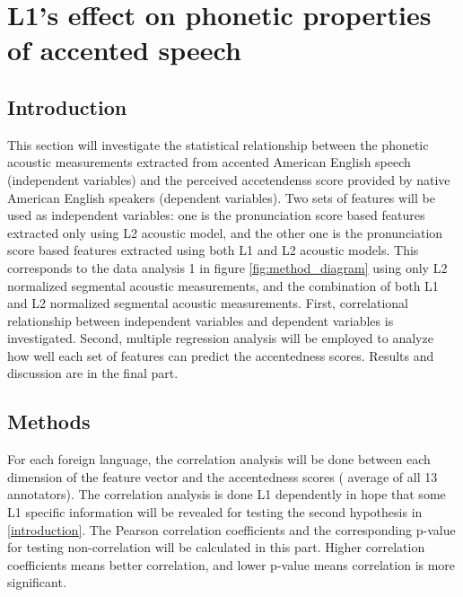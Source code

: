 \chapter{L1's effect on phonetic properties of accented speech}
\label{l1_seg}

\section{Introduction}

This section will investigate the statistical relationship between the phonetic acoustic measurements extracted from accented American English speech (independent variables) and the perceived accetendenss score provided by native American English speakers (dependent variables). Two sets of features will be used as independent variables: one is the pronunciation score based features extracted only using L2 acoustic model, and the other one is the pronunciation score based features extracted using both L1 and L2 acoustic models. This corresponds to the data analysis 1 in figure \ref{fig:method_diagram} using only L2 normalized segmental acoustic measurements, and the combination of  both L1 and L2 normalized segmental acoustic measurements. First, correlational relationship between independent variables and dependent variables is investigated. Second, multiple regression analysis will be employed to analyze how well each set of features can predict the accentedness scores. Results and discussion are in the final part.

\section{Methods}


For each foreign language, the correlation analysis will be done between each dimension of the feature vector and the accentedness scores ( average of all 13 annotators). The correlation analysis is done L1 dependently in hope that some L1 specific information will be revealed for testing the second hypothesis in \ref{introduction}. The Pearson correlation coefficients and the corresponding p-value for testing non-correlation will be calculated in this part. Higher correlation coefficients means better correlation, and lower p-value means correlation is more significant.

